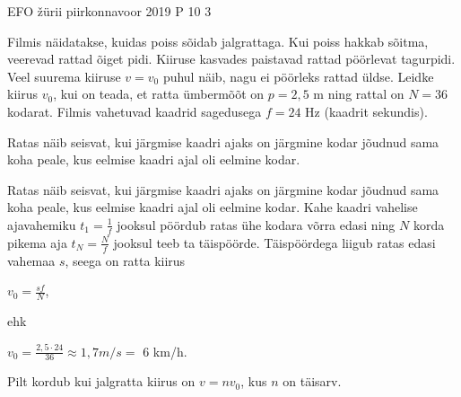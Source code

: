 {EFO žürii} %
{piirkonnavoor} %
{2019} %
{P 10} %
{3} %
{

\ifStatement
Filmis näidatakse, kuidas poiss sõidab jalgrattaga. Kui poiss hakkab sõitma, veerevad rattad õiget pidi. Kiiruse kasvades paistavad rattad pöörlevat tagurpidi. Veel suurema kiiruse $v = v_0$ puhul näib, nagu ei pöörleks rattad üldse. Leidke kiirus $v_0$, kui on teada, et ratta ümbermõõt on $p = 2,5$ m ning rattal on $N = 36$ kodarat. Filmis vahetuvad kaadrid sagedusega $f = 24$ Hz (kaadrit sekundis).
\fi

\ifHint
Ratas näib seisvat, kui järgmise kaadri ajaks on järgmine kodar jõudnud sama koha peale, kus eelmise kaadri ajal oli eelmine kodar.
\fi

\ifSolution
Ratas näib seisvat, kui järgmise kaadri ajaks on järgmine kodar jõudnud sama koha peale, kus eelmise kaadri ajal oli eelmine kodar. Kahe kaadri vahelise ajavahemiku $t_1 = \frac{1}{f}$ jooksul pöördub ratas ühe kodara võrra edasi ning $N$ korda pikema aja $t_N = \frac{N}{f}$ jooksul teeb ta täispöörde. Täispöördega liigub ratas edasi vahemaa $s$, seega on ratta kiirus
\begin{center}
$v_0 = \frac{sf}{N}$,
\end{center}
ehk
\begin{center}
$v_0 = \frac{2,5 \cdot 24}{36} \approx 1,7 m/s =$ $6$ km/h.
\end{center}
Pilt kordub kui jalgratta kiirus on $v = nv_0$, kus $n$ on täisarv.
\fi
}